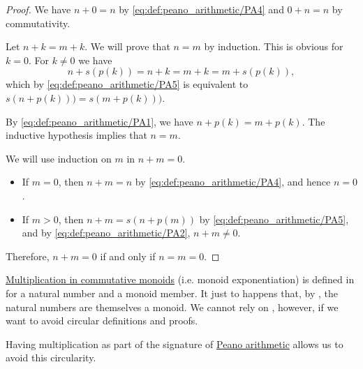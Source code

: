 \begin{proof}
   We have \( n + 0 = n \) by \eqref{eq:def:peano_arithmetic/PA4} and \( 0 + n = n \) by commutativity.

   Let \( n + k = m + k \). We will prove that \( n = m \) by induction. This is obvious for \( k = 0 \). For \( k \neq 0 \) we have
  \begin{equation*}
    n + s(p(k))
    =
    n + k
    =
    m + k
    =
    m + s(p(k)),
  \end{equation*}
  which by \eqref{eq:def:peano_arithmetic/PA5} is equivalent to \( s(n + p(k))) = s(m + p(k))) \).

  By \eqref{eq:def:peano_arithmetic/PA1}, we have \( n + p(k) = m + p(k) \). The inductive hypothesis implies that \( n = m \).

   We will use induction on \( m \) in \( n + m = 0 \).
  \begin{itemize}
    \item If \( m = 0 \), then \( n + m = n \) by \eqref{eq:def:peano_arithmetic/PA4}, and hence \( n = 0 \).

    \item If \( m > 0 \), then \( n + m = s(n + p(m)) \) by \eqref{eq:def:peano_arithmetic/PA5}, and by \eqref{eq:def:peano_arithmetic/PA2}, \( n + m \neq 0 \).
  \end{itemize}

  Therefore, \( n + m = 0 \) if and only if \( n = m = 0 \).
\end{proof}

\begin{remark}\label{rem:natural_number_multiplication}
  \hyperref[rem:additive_magma/multiplication]{Multiplication in commutative monoids} (i.e. monoid exponentiation) is defined in  for a natural number and a monoid member. It just to happens that, by , the natural numbers are themselves a monoid. We cannot rely on , however, if we want to avoid circular definitions and proofs.

  Having multiplication as part of the signature of \hyperref[def:peano_arithmetic]{Peano arithmetic} allows us to avoid this circularity.
\end{remark}

